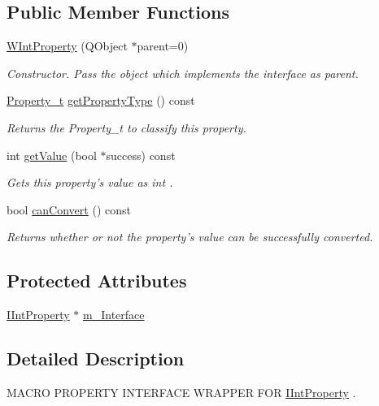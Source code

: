 \subsection*{Public Member Functions}
\begin{DoxyCompactItemize}
\item 
\hyperlink{class_w_int_property_a5d3ce207add6e3a5f3868010cf9f37e1}{W\-Int\-Property} (Q\-Object $\ast$parent=0)
\begin{DoxyCompactList}\small\item\em Constructor. Pass the object which implements the interface as parent. \end{DoxyCompactList}\item 
\hyperlink{group___property_classes_ga38f1ccddda12c7cb50b868c9f789ee37}{Property\-\_\-t} \hyperlink{class_w_int_property_a7881a1f19cf84fc5552188393cf5d7d9}{get\-Property\-Type} () const 
\begin{DoxyCompactList}\small\item\em Returns the Property\-\_\-t to classify this property. \end{DoxyCompactList}\item 
int \hyperlink{class_w_int_property_aea678a96a398024ac3cdcdb31e5999de}{get\-Value} (bool $\ast$success) const 
\begin{DoxyCompactList}\small\item\em Gets this property's value as int . \end{DoxyCompactList}\item 
bool \hyperlink{class_w_int_property_a2aadf339189421871abccd98b553ce6b}{can\-Convert} () const 
\begin{DoxyCompactList}\small\item\em Returns whether or not the property's value can be successfully converted. \end{DoxyCompactList}\end{DoxyCompactItemize}
\subsection*{Protected Attributes}
\begin{DoxyCompactItemize}
\item 
\hyperlink{class_i_int_property}{I\-Int\-Property} $\ast$ \hyperlink{class_w_int_property_a7c4faa1f37d022fe9bc1bd2da01c2213}{m\-\_\-\-Interface}
\end{DoxyCompactItemize}


\subsection{Detailed Description}
M\-A\-C\-R\-O P\-R\-O\-P\-E\-R\-T\-Y I\-N\-T\-E\-R\-F\-A\-C\-E W\-R\-A\-P\-P\-E\-R F\-O\-R \hyperlink{class_i_int_property}{I\-Int\-Property} . 

